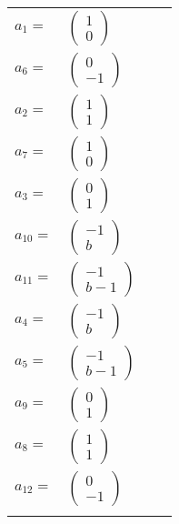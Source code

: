 \documentclass[1p]{elsarticle_modified}
\theoremstyle{definition}
\begin{document}
\begin{tabular}{m{7pt} m{180pt} m{7pt} m{180pt} }
\flushright $a_{1}=$&$\begin{pmatrix}1\\0\end{pmatrix}$ \\
\flushright $a_{6}=$&$\begin{pmatrix}0\\-1\end{pmatrix}$ \\
\flushright $a_{2}=$&$\begin{pmatrix}1\\1\end{pmatrix}$ \\
\flushright $a_{7}=$&$\begin{pmatrix}1\\0\end{pmatrix}$ \\
\flushright $a_{3}=$&$\begin{pmatrix}0\\1\end{pmatrix}$ \\
\flushright $a_{10}=$&$\begin{pmatrix}-1\\b\end{pmatrix}$ \\
\flushright $a_{11}=$&$\begin{pmatrix}-1\\b-1\end{pmatrix}$ \\
\flushright $a_{4}=$&$\begin{pmatrix}-1\\b\end{pmatrix}$ \\
\flushright $a_{5}=$&$\begin{pmatrix}-1\\b-1\end{pmatrix}$ \\
\flushright $a_{9}=$&$\begin{pmatrix}0\\1\end{pmatrix}$ \\
\flushright $a_{8}=$&$\begin{pmatrix}1\\1\end{pmatrix}$ \\
\flushright $a_{12}=$&$\begin{pmatrix}0\\-1\end{pmatrix}$\\&\end{tabular}
\end{document}
